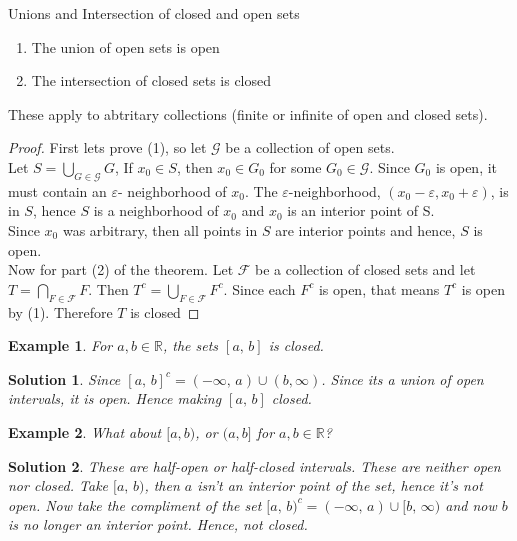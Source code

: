 \documentclass{article}
\newcommand{\R}{\mathbb{R}}
\newcommand{\e}{\varepsilon}
\newtheorem{example}{Example}
\newtheorem{solution}{Solution}
\begin{document}
\begin{theorem}{Unions and Intersection of closed and open sets}{}
  \begin{enumerate}
    \item  The union of open sets is open
    \item The intersection of closed sets is closed
  \end{enumerate}
  These apply to abtritary collections (finite or infinite of open and closed sets).
\end{theorem}
\begin{proof}
  First lets prove (1), so let $\displaystyle{\mathcal{G}}$ be a collection of open sets.\\
  Let $\displaystyle{S = \bigcup_{G \in \mathcal{G}}G}$, If $\displaystyle{x_0 \in S}$, then $\displaystyle{x_0 \in G_0}$ for some $\displaystyle{G_0 \in \mathcal{G}}$. Since $G_0$ is open, it must contain an $\e$- neighborhood of $x_0$. The $\e$-neighborhood, $(x_0-\e, x_0+\e)$, is in $S$, hence $S$ is a neighborhood of $x_0$ and $x_0$ is an interior point of S. \\
  Since $x_0$ was arbitrary, then all points in $S$ are interior points and hence, $S$ is open.\\
  Now for part (2) of the theorem. Let $\displaystyle{\mathcal{F}}$ be a collection of closed sets and let $\displaystyle{T = \bigcap_{F\in \mathcal{F}}F}$. Then $\displaystyle{T^c = \bigcup_{F\in\mathcal{F}}F^c}$. Since each $F^c$ is open, that means $T^c$ is open by (1). Therefore $T$ is closed
\end{proof}

\begin{example}{
 For $a, b \in \R$, the sets $[a,\, b]$ is closed.
}\end{example}\begin{solution}{
  Since $[a,\, b]^c = (-\infty,\, a) \cup (b, \infty)$. Since its a union of open intervals, it is open. Hence making $[a,\, b]$ closed.
}\end{solution}\vspace{10pt}

\begin{example}{
  What about $[a, b)$, or $(a, b]$ for $a, b \in \R$?
}\end{example}\begin{solution}{
  These are half-open or half-closed intervals. These are neither open nor closed. Take $\displaystyle{[a,\, b)}$, then $a$ isn't an interior point of the set, hence it's not open. Now take the compliment of the set $\displaystyle{[a,\,b)^c = (-\infty,\, a)\cup[b,\, \infty)}$ and now $b$ is no longer an interior point. Hence, not closed.
}\end{solution}\vspace{10pt}
\end{document}
